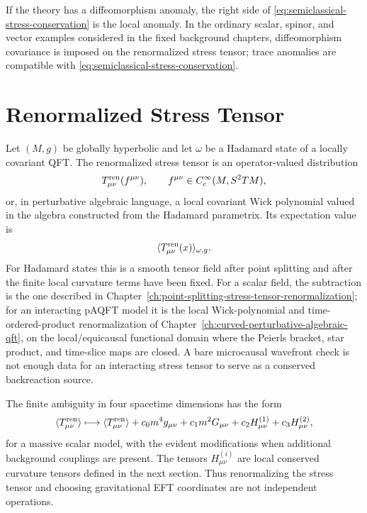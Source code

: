 If the theory has a diffeomorphism anomaly, the right side of
\eqref{eq:semiclassical-stress-conservation} is the local anomaly.  In the
ordinary scalar, spinor, and vector examples considered in the fixed
background chapters, diffeomorphism covariance is imposed on the
renormalized stress tensor; trace anomalies are compatible with
\eqref{eq:semiclassical-stress-conservation}.

\section{Renormalized Stress Tensor}

Let \((M,g)\) be globally hyperbolic and let \(\omega\) be a Hadamard state
of a locally covariant QFT.  The renormalized stress tensor is an
operator-valued distribution
\[
  T_{\mu\nu}^{\rm ren}(f^{\mu\nu}),
  \qquad
  f^{\mu\nu}\in C_c^\infty(M,S^2TM),
\]
or, in perturbative algebraic language, a local covariant Wick polynomial
valued in the algebra constructed from the Hadamard parametrix.  Its
expectation value is
\[
  \langle T_{\mu\nu}^{\rm ren}(x)\rangle_{\omega,g}.
\]
For Hadamard states this is a smooth tensor field after point splitting and
after the finite local curvature terms have been fixed.  For a scalar field,
the subtraction is the one described in
Chapter~\ref{ch:point-splitting-stress-tensor-renormalization}; for an
interacting pAQFT model it is the local Wick-polynomial and
time-ordered-product renormalization of
Chapter~\ref{ch:curved-perturbative-algebraic-qft}, on the local/equicausal
functional domain where the Peierls bracket, star product, and time-slice
maps are closed.  A bare microcausal wavefront check is not enough data for
an interacting stress tensor to serve as a conserved backreaction source.

The finite ambiguity in four spacetime dimensions has the form
\begin{equation}
  \langle T_{\mu\nu}^{\rm ren}\rangle
  \longmapsto
  \langle T_{\mu\nu}^{\rm ren}\rangle
  +
  c_0m^4g_{\mu\nu}
  +
  c_1m^2G_{\mu\nu}
  +
  c_2H^{(1)}_{\mu\nu}
  +
  c_3H^{(2)}_{\mu\nu},
  \label{eq:semiclassical-stress-finite-ambiguity}
\end{equation}
for a massive scalar model, with the evident modifications when additional
background couplings are present.  The tensors \(H^{(i)}_{\mu\nu}\) are
local conserved curvature tensors defined in the next section.  Thus
renormalizing the stress tensor and choosing gravitational EFT coordinates
are not independent operations.

